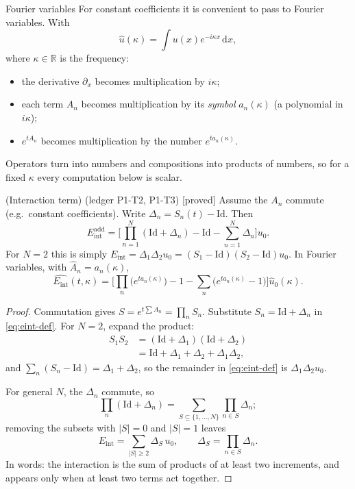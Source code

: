 \documentclass[11pt,a4paper]{article}
\theoremstyle{definition}
\newcommand{\badge}[2]{\textcolor{#1}{\textsf{\footnotesize[#2]}}}
\newcommand{\proved}[1][]{\badge{cC}{proved#1}}
\newcommand{\led}[1]{\textcolor{cG}{\textsf{\footnotesize(ledger #1)}}}
\newcommand{\R}{\mathbb{R}}\newcommand{\C}{\mathbb{C}}\newcommand{\N}{\mathbb{N}}\newcommand{\Z}{\mathbb{Z}}
\newcommand{\Eint}{E_{\mathrm{int}}}
\newcommand{\Id}{\mathrm{Id}}
\newcommand{\dd}{\,\mathrm{d}}
\begin{document}
\begin{notebox}{Fourier variables}
For constant coefficients it is convenient to pass to Fourier variables. With
\[
\hat u(\kappa)=\int u(x)e^{-i\kappa x}\dd x,
\]
where $\kappa\in\R$ is the frequency:
\begin{itemize}[nosep]
\item the derivative $\partial_x$ becomes multiplication by $i\kappa$;
\item each term $A_n$ becomes multiplication by its \emph{symbol} $a_n(\kappa)$ (a polynomial in $i\kappa$);
\item $e^{tA_n}$ becomes multiplication by the number $e^{ta_n(\kappa)}$.
\end{itemize}
Operators turn into numbers and compositions into products of numbers, so for a fixed $\kappa$ every computation below is scalar.
\end{notebox}
\begin{theorem}{(Interaction term) \led{P1-T2, P1-T3} \proved[]}\label{thm:eint}
Assume the $A_n$ commute (e.g.\ constant coefficients). Write $\Delta_n=S_n(t)-\Id$. Then
\begin{equation}\label{eq:eint}
\Eint^{\mathrm{add}}=\Big[\prod_{n=1}^N(\Id+\Delta_n)-\Id-\sum_{n=1}^N\Delta_n\Big]u_0 .
\end{equation}
For $N=2$ this is simply $\Eint=\Delta_1\Delta_2u_0=(S_1-\Id)(S_2-\Id)u_0$. In Fourier variables, with $\hat A_n=a_n(\kappa)$,
\[
\widehat{\Eint}(t,\kappa)=\Big[\prod_n\big(e^{ta_n(\kappa)}\big)-1-\sum_n\big(e^{ta_n(\kappa)}-1\big)\Big]\hat u_0(\kappa).
\]
\end{theorem}
\begin{proof}
Commutation gives $S=e^{t\sum A_n}=\prod_nS_n$. Substitute $S_n=\Id+\Delta_n$ in \eqref{eq:eint-def}. For $N=2$, expand the product:
\[
\begin{aligned}
S_1S_2&=(\Id+\Delta_1)(\Id+\Delta_2)\\
&=\Id+\Delta_1+\Delta_2+\Delta_1\Delta_2 ,
\end{aligned}
\]
and $\sum_n(S_n-\Id)=\Delta_1+\Delta_2$, so the remainder in \eqref{eq:eint-def} is $\Delta_1\Delta_2u_0$.

For general $N$, the $\Delta_n$ commute, so
\[
\prod_n(\Id+\Delta_n)=\sum_{S\subseteq\{1,\dots,N\}}\prod_{n\in S}\Delta_n ;
\]
removing the subsets with $|S|=0$ and $|S|=1$ leaves
\[
\Eint=\sum_{|S|\ge2}\Delta_S\,u_0,\qquad \Delta_S=\prod_{n\in S}\Delta_n .
\]
In words: the interaction is the sum of products of at least two increments, and appears only when at least two terms act together.
\end{proof}
\end{document}
